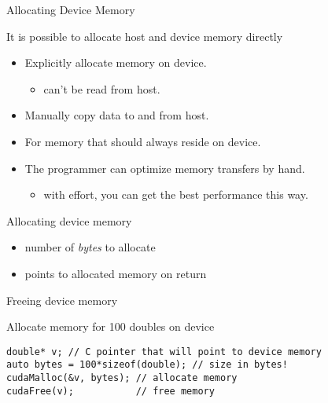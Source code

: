 \documentclass[aspectratio=43]{beamer}
\begin{document}
\begin{frame}[fragile]{Allocating Device Memory}

    It is possible to allocate host and device memory directly
    \begin{itemize}
        \item Explicitly allocate memory on device.
        \begin{itemize}
            \item can't be read from host.
        \end{itemize}
        \item Manually copy data to and from host.
        \item For memory that should always reside on device.
        \item The programmer can optimize memory transfers by hand.
        \begin{itemize}
            \item with effort, you can get the best performance this way.
        \end{itemize}
    \end{itemize}
\end{frame}

\begin{frame}[fragile]{}
    \begin{info}{Allocating device memory}
        \centering {}
    \begin{itemize}
        \item {} number of \emph{bytes} to allocate
        \item {} points to allocated memory on return
    \end{itemize}
    \end{info}

    \begin{info}{Freeing device memory}
        \centering {}
    \end{info}

    \begin{code}{Allocate memory for 100 doubles on device}
        \begin{lstlisting}[style=boxcuda]
double* v; // C pointer that will point to device memory
auto bytes = 100*sizeof(double); // size in bytes!
cudaMalloc(&v, bytes); // allocate memory
cudaFree(v);           // free memory
\end{lstlisting}
    \end{code}
\end{frame}
\end{document}

